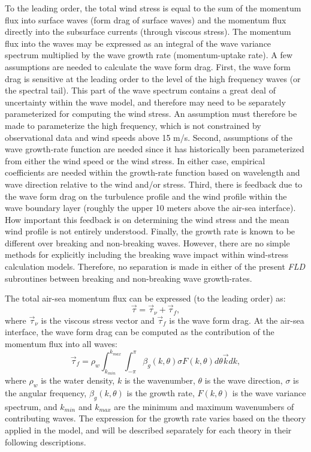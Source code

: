 To the leading order, the total wind stress is equal to the sum of the momentum flux into surface waves (form drag of surface waves) and the momentum flux directly into the subsurface currents (through viscous stress).
The momentum flux into the waves may be expressed as an integral of the wave variance spectrum multiplied by the wave growth rate (momentum-uptake rate).
A few assumptions are needed to calculate the wave form drag.
First, the wave form drag is sensitive at the leading order to the level of the high frequency waves (or the spectral tail).
This part of the wave spectrum contains a great deal of uncertainty within the wave model, and therefore may need to be separately parameterized for computing the wind stress.
An assumption must therefore be made to parameterize the high frequency, which is not constrained by observational data and wind speeds above 15 m/s.
Second, assumptions of the wave growth-rate function are needed since it has historically been parameterized from either the wind speed or the wind stress.
In either case, empirical coefficients are needed within the growth-rate function based on wavelength and wave direction relative to the wind and/or stress.
Third, there is feedback due to the wave form drag on the turbulence profile and the wind profile within the wave boundary layer (roughly the upper 10 meters above the air-sea interface).
How important this feedback is on determining the wind stress and the mean wind profile is not entirely understood.
Finally, the growth rate is known to be different over breaking and non-breaking waves.
However, there are no simple methods for explicitly including the breaking wave impact within wind-stress calculation models.
Therefore, no separation is made in either of the present {\it FLD} subroutines between breaking and non-breaking wave growth-rates.

The total air-sea momentum flux can be expressed (to the leading order) as:
\begin{equation}
\vec{\tau}=\vec{\tau}_{\nu}+\vec{\tau}_{f},
\end{equation}
where $\vec{\tau}_{\nu}$ is the viscous stress vector and $\vec{\tau}_{f}$ is the wave form drag.
At the air-sea interface, the wave form drag can be computed as the contribution of the momentum flux into all waves:
\begin{equation}\label{formdrag}
\vec{\tau}_{f}=\rho_w\int_{k_{min}}^{k_{max}}\int_{-\pi}^{\pi} \beta_g(k,\theta) \sigma F (k,\theta) d\theta \vec{k} dk,
\end{equation}
where $\rho_w$ is the water density, $k$ is the wavenumber, $\theta$ is the wave direction, $\sigma$ is the angular frequency, $\beta_g (k,\theta)$ is the growth rate,
$F (k,\theta)$ is the wave variance spectrum, and $k_{min}$ and $k_{max}$ are the minimum and maximum wavenumbers of contributing waves.
The expression for the growth rate varies based on the theory applied in the model, and will be described separately for each theory in their following descriptions.

